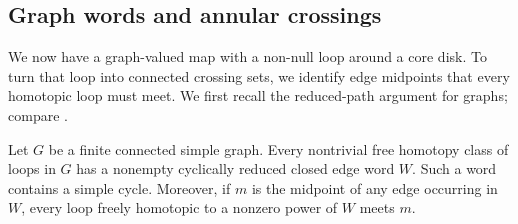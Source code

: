 \subsection{Graph words and annular crossings}

We now have a graph-valued map with a non-null loop around a core disk.
To turn that loop into connected crossing sets, we identify edge
midpoints that every homotopic loop must meet.  We first recall the
reduced-path argument for graphs; compare
\citet[Section~1.A]{Hatcher2002}.

\begin{lemma}
\label{lem:interfaces-graph-word}
Let $G$ be a finite connected simple graph.  Every nontrivial free
homotopy class of loops in $G$ has a nonempty cyclically reduced closed
edge word $W$.  Such a word contains a simple cycle.  Moreover, if $m$
is the midpoint of any edge occurring in $W$, every loop freely
homotopic to a nonzero power of $W$ meets $m$.
\end{lemma}

